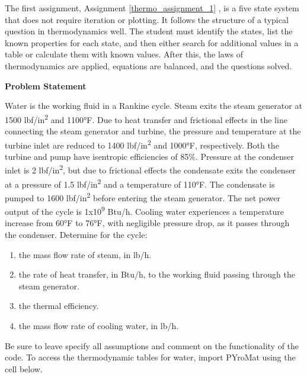 The first assignment, Assignment \ref{thermo_assignment_1} \cite{thermodynamics}, is a five state system 
that does not require 
iteration or plotting. It follows the structure of a typical question in thermodynamics well. The student 
must identify the states, list the known properties for each state, and then either search for additional 
values in a table or calculate them with known values. After this, the laws of thermodynamics are applied, 
equations are balanced, and the questions solved.

\label{thermo_assignment_1}

\begin{tcolorbox}[breakable, enhanced jigsaw, title=ME 513: Assignment \ref{thermo_assignment_1}, 
    colframe=ksu-purple, colback=ksu-gray]

    \textbf{Problem Statement}
    \parindent15pt

    Water is the working fluid in a Rankine cycle. Steam exits the steam generator at 1500 
    lbf/in\textsuperscript{2}  and 1100°F. Due to heat transfer and frictional effects in 
    the line connecting the steam generator and turbine, the pressure and temperature at the 
    turbine inlet are reduced to 1400 lbf/in\textsuperscript{2} and 1000°F, respectively. Both the 
    turbine and pump have isentropic efficiencies of 85\%. Pressure at the condenser inlet 
    is 2 lbf/in\textsuperscript{2}, but due to frictional effects the condensate exits the 
    condenser at a pressure of 1.5 lbf/in\textsuperscript{2} and a temperature of 110°F. The 
    condensate is pumped to 1600 lbf/in\textsuperscript{2} before entering the steam generator. 
    The net power output of the cycle is 1x10\textsuperscript{9} Btu/h. Cooling water experiences 
    a temperature increase from 60°F to 76°F, with negligible pressure drop, as it passes 
    through the condenser. Determine for the cycle:

    \begin{enumerate}
        \item the mass flow rate of steam, in lb/h.
        \item the rate of heat transfer, in Btu/h, to the working fluid passing through the steam 
        generator. 
        \item the thermal efficiency.
        \item the mass flow rate of cooling water, in lb/h.
    \end{enumerate}

    Be sure to leave specify all assumptions and comment on the functionality of the code. 
    To access the thermodynamic tables for water, import PYroMat using the cell below.


\end{tcolorbox}
